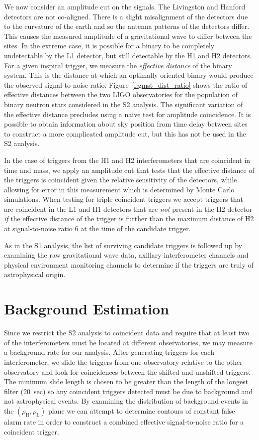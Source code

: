 We now consider an amplitude cut on the signals. The Livingston and Hanford
detectors are not co-aligned. There is a slight misalignment of the detectors
due to the curvature of the earth and so the antenna patterns of the detectors
differ. This causes the measured amplitude of a gravitational wave to differ
between the sites. In the extreme case, it is possible for a binary to be
completely undetectable by the L1 detector, but still detectable by the H1 and
H2 detectors. For a given inspiral trigger, we measure the \emph{effective
distance} of the binary system. This is the distance at which an optimally
oriented binary would produce the observed signal-to-noise ratio.
Figure~\ref{f:gmst_dist_ratio} shows the ratio of effective distances between
the two LIGO observatories for the population of binary neutron stars
considered in the S2 analysis. The significant variation of the effective
distance precludes using a naive test for amplitude coincidence. It is
possible to obtain information about sky position from time delay between
sites to construct a more complicated amplitude cut, but this has not be used
in the S2 analysis.

In the case of triggers from the H1 and H2 interferometers that are coincident
in time and mass, we apply an amplitude cut that tests that the effective
distance of the triggers is coincident given the relative sensitivity of the
detectors, while allowing for error in this measurement which is determined by
Monte Carlo simulations.  When testing for triple coincident triggers we 
accept triggers that are coincident in the L1 and H1 detectors that are
\emph{not} present in the H2 detector \emph{if} the effective distance of the
trigger is further than the maximum distance of H2 at signal-to-noise ratio
$6$ at the time of the candidate trigger.

As in the S1 analysis, the list of surviving candidate triggers is followed up
by examining the raw gravitational wave data, axillary interferometer channels
and physical environment monitoring channels to determine if the triggers are
truly of astrophysical origin.

\section{Background Estimation}
\label{s:background}

Since we restrict the S2 analysis to coincident data and require that at least
two of the interferometers must be located at different observatories, we may
measure a background rate for our analysis. After generating triggers for each
interferometer, we slide the triggers from one observatory relative to the
other observatory and look for coincidences between the shifted and unshifted
triggers. The minimum slide length is chosen to be greater than the length of
the longest filter ($20$~sec) so any coincident triggers detected must be due to background and
not astrophysical events. By examining the distribution of background events
in the $(\rho_\mathrm{H},\rho_\mathrm{L})$ plane we can attempt to determine
contours of constant false alarm rate in order to construct a combined
effective signal-to-noise ratio for a coincident trigger\cite{abbott2004a}.

